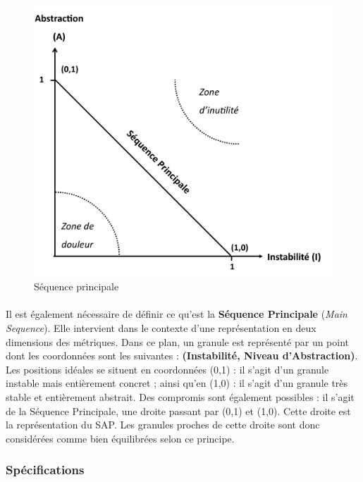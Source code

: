 \documentclass{scrartcl}
\begin{document}
\begin{figure}[ht!]
    \centering
    \includegraphics[scale=0.2]{img/MainSequence.png}
    \caption{Séquence principale}
\end{figure}

    \paragraph{}Il est également nécessaire de définir ce qu'est la \textbf{Séquence Principale} (\emph{Main Sequence}). Elle intervient dans le contexte d'une représentation en deux dimensions des métriques. Dans ce plan, un granule est représenté par un point dont les coordonnées sont les suivantes : \textbf{(Instabilité, Niveau d'Abstraction)}. Les positions idéales se situent en coordonnées (0,1) : il s'agit d'un granule instable mais entièrement concret ; ainsi qu'en (1,0) : il s'agit d'un granule très stable et entièrement abstrait. Des compromis sont également possibles : il s'agit de la Séquence Principale, une droite passant par (0,1) et (1,0). Cette droite est la représentation du SAP. Les granules proches de cette droite sont donc considérées comme bien équilibrées selon ce principe.
    


\subsubsection{Spécifications}
    \label{martin:specification}
\end{document}
